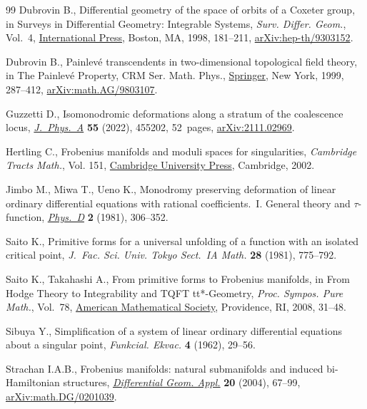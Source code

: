\documentclass[pdftex]{sigma}
\numberwithin{equation}{section}
\begin{document}
\begin{thebibliography}{99}
Dubrovin B., Differential geometry of the space of orbits of a {C}oxeter group,
 in Surveys in {D}ifferential {G}eometry: {I}ntegrable {S}ystems,
 \textit{Surv. Differ. Geom.}, Vol.~4, \href{https://doi.org/10.4310/SDG.1998.v4.n1.a4}{International Press}, Boston, MA, 1998,
 181--211, \href{https://arxiv.org/abs/hep-th/9303152}{arXiv:hep-th/9303152}.

Dubrovin B., Painlev\'e transcendents in two-dimensional topological field
 theory, in The {P}ainlev\'e {P}roperty, CRM Ser. Math. Phys., \href{https://doi.org/10.1007/978-1-4612-1532-5_6}{Springer}, New
 York, 1999, 287--412, \href{https://arxiv.org/abs/math.AG/9803107}{arXiv:math.AG/9803107}.

Guzzetti D., Isomonodromic deformations along a stratum of the coalescence
 locus, \href{https://doi.org/10.1088/1751-8121/ac9ba8}{\textit{J.~Phys.~A}} \textbf{55} (2022), 455202, 52~pages,
 \href{https://arxiv.org/abs/2111.02969}{arXiv:2111.02969}.

Hertling C., Frobenius manifolds and moduli spaces for singularities,
 \textit{Cambridge Tracts Math.}, Vol. 151, \href{https://doi.org/10.1017/CBO9780511543104}{Cambridge University Press},
 Cambridge, 2002.

Jimbo M., Miwa T., Ueno K., Monodromy preserving deformation of linear ordinary
 differential equations with rational coefficients.~{I}. {G}eneral theory and
 {$\tau $}-function, \href{https://doi.org/10.1016/0167-2789(81)90013-0}{\textit{Phys.~D}} \textbf{2} (1981), 306--352.

Saito K., Primitive forms for a universal unfolding of a function with an
 isolated critical point, \textit{J.~Fac. Sci. Univ. Tokyo Sect.~IA Math.}
 \textbf{28} (1981), 775--792.

Saito K., Takahashi A., From primitive forms to {F}robenius manifolds, in From
 {H}odge {T}heory to {I}ntegrability and {TQFT} tt*-{G}eometry, \textit{Proc.
 Sympos. Pure Math.}, Vol.~78, \href{https://doi.org/10.1090/pspum/078/2483747}{American Mathematical Society}, Providence, RI,
 2008, 31--48.

Sibuya Y., Simplification of a system of linear ordinary differential equations
 about a singular point, \textit{Funkcial. Ekvac.} \textbf{4} (1962), 29--56.

Strachan I.A.B., Frobenius manifolds: natural submanifolds and induced
 bi-{H}amiltonian structures, \href{https://doi.org/10.1016/j.difgeo.2003.10.001}{\textit{Differential Geom. Appl.}} \textbf{20}
 (2004), 67--99, \href{https://arxiv.org/abs/math.DG/0201039}{arXiv:math.DG/0201039}.

\end{thebibliography}\LastPageEnding
\end{document}
